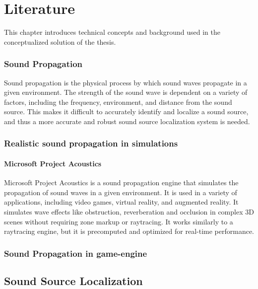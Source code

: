 \chapter{Literature}
\label{ch:background}

This chapter introduces technical concepts and background used in the conceptualized solution of the thesis.

\subsection{Sound Propagation}

Sound propagation is the physical process by which sound waves propagate in a given environment. The strength of the sound wave is dependent on a variety of factors, including the frequency, environment, and distance from the sound source. This makes it difficult to accurately identify and localize a sound source, and thus a more accurate and robust sound source localization system is needed.

\subsection{Realistic sound propagation in simulations}

\subsubsection{Microsoft Project Acoustics}

Microsoft Project Acoustics is a sound propagation engine that simulates the propagation of sound waves in a given environment. It is used in a variety of applications, including video games, virtual reality, and augmented reality. It simulates wave effects like obstruction, reverberation and occlusion in complex 3D scenes without requiring zone markup or raytracing. It works similarly to a raytracing engine, but it is precomputed and optimized for real-time performance. 



\subsection{Sound Propagation in game-engine}

\section{Sound Source Localization}

